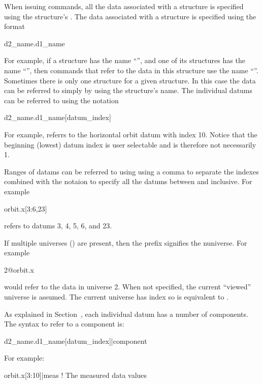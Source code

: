 When issuing \tao commands, all the
data associated with a  structure is specified using the
 structure's .  The data associated with a
 structure is specified using the format
\begin{example}
  d2_name.d1_name
\end{example}
For example, if a  structure has the
name ``'', and one of its  structures has the
name ``'', then \tao commands that refer to the data in this
 structure use the name ``''. Sometimes there
is only one  structure for a given 
structure. In this case the data can be referred to simply by using
the  structure's name. The individual datums can be
referred to using the notation
\begin{example}
  d2_name.d1_name[datum_index]
\end{example}
For example,  referrs to the horizontal orbit datum
with index 10. Notice that the beginning (lowest) datum index is user
selectable and is therefore not necessarily 1.

Ranges of datams can be referred to using using a comma \vn{,} to
separate the indexes combined with the notaion  to specify
all the datums between  and  inclusive. For example
\begin{example}
  orbit.x[3:6,23]
\end{example}
refers to datums 3, 4, 5, 6, and 23. 

If multiple universes () are present, then the prefix
 signifies the n\Th universe. For example
\begin{example}
  2@orbit.x
\end{example}
would refer to the  data in universe 2. When not
specified, the current ``viewed'' universe is assumed. The current
 universe has index  so  is
equivalent to .

As explained in Section~, each individual datum
has a number of components. The syntax to refer to a component is:
\begin{example}
  d2_name.d1_name[datum_index]|component
\end{example}
For example:
\begin{example}
  orbit.x[3:10]|meas     ! The measured data values
\end{example}


